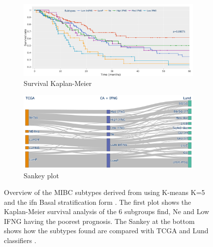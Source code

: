 \begin{figure}[!htb]
    \centering
    \begin{subfigure}[!t]{1.0\textwidth}
        \includegraphics[width=\textwidth,keepaspectratio]{Sections/ClusteringAnalysis/Resources/discussion/survival_K_6.png}    
        \caption{Survival Kaplan-Meier}
        \label{fig:cs:overview_survival}
    \end{subfigure}
    \centering
    \begin{subfigure}[!t]{1.0\textwidth}
        \includegraphics[width=\textwidth,keepaspectratio]{Sections/ClusteringAnalysis/Resources/discussion/KMeans_6_comp.png}
        \caption{Sankey plot}
        \label{fig:cs:overview_comp}
    \end{subfigure} 
    \centering
    \caption[Summary of the new MIBC subtypes]{Overview of the MIBC subtypes derived from using K-means K=5 and the \acrshort{ifn} Basal stratification form \citet{Baker2022-bj}. The first plot shows the Kaplan-Meier survival analysis of the 6 subgroups find, Ne and Low IFNG having the poorest prognosis. The Sankey at the bottom shows how the subtypes found are compared with TCGA and Lund classifiers \citep{Robertson2017-mg,Marzouka2018-ge}.} 
    \label{fig:cs:overview_K_means_6}
\end{figure}




